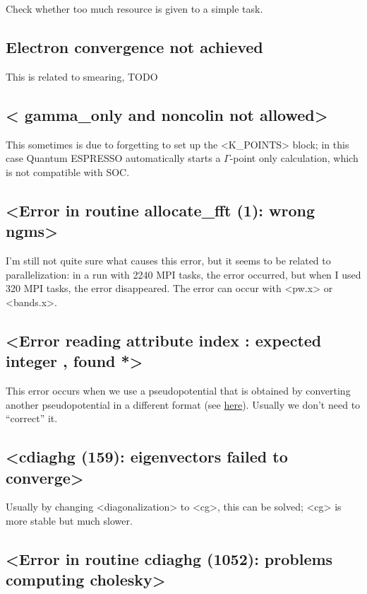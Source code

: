 \documentclass[hyperref, a4paper, 12pt]{report}
\def\texttt#1{<#1>}%
\newcommand{\shortcode}[1]{\texttt{#1}}
\begin{document}
Check whether too much resource is given to a simple task.

\subsection{Electron convergence not achieved}

This is related to smearing, TODO 

\subsection{\shortcode{  gamma_only and noncolin not allowed}}

This sometimes is due to forgetting to set up the \shortcode{K_POINTS} block; 
in this case Quantum ESPRESSO automatically starts a $\Gamma$-point only calculation,
which is not compatible with SOC.

\subsection{\shortcode{Error in routine allocate_fft (1): wrong ngms}}\label{sec:ngms}

I'm still not quite sure what causes this error,
but it seems to be related to parallelization:
in a run with 2240 MPI tasks, 
the error occurred,
but when I used 320 MPI tasks,
the error disappeared.
The error can occur with \shortcode{pw.x} or \shortcode{bands.x}.

\subsection{\shortcode{Error reading attribute index : expected integer , found *}}

This error occurs when we use a pseudopotential 
that is obtained by converting another pseudopotential in a different format
(see \href{https://lists.quantum-espresso.org/pipermail/users/2021-February/046995.html}{here}). 
Usually we don't need to ``correct'' it.

\subsection{\shortcode{cdiaghg (159): eigenvectors failed to converge}}

Usually by changing \shortcode{diagonalization} to \shortcode{cg},
this can be solved; 
\shortcode{cg} is more stable but much slower.

\subsection{\shortcode{Error in routine  cdiaghg (1052):  problems computing cholesky}}
\end{document}

